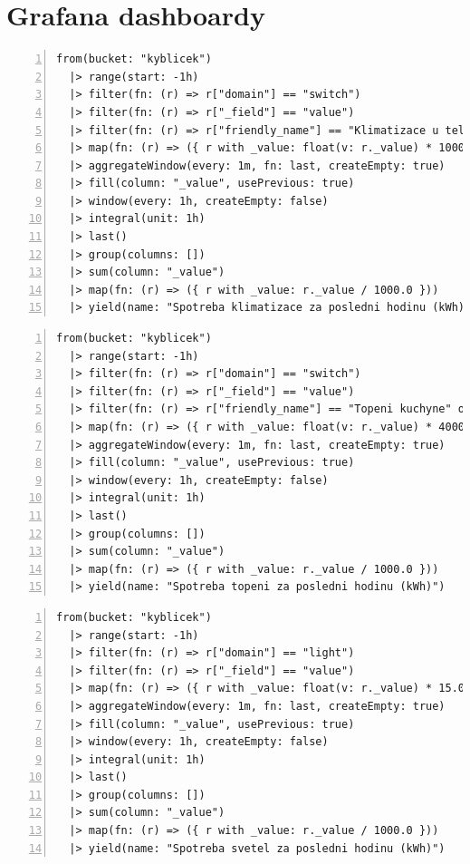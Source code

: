 \chapter{Grafana dashboardy}
\label{apend:grafana}
\begin{lstlisting}[language=flux, breaklines=true, numbers=left, numberstyle=\small, numbersep=10pt, frame=single, basicstyle=\ttfamily\small, caption={Grafana - Spotřeba klimatizace}, label={lst:grafanaKlimatizaceEnergie}]
from(bucket: "kyblicek")
  |> range(start: -1h)
  |> filter(fn: (r) => r["domain"] == "switch")
  |> filter(fn: (r) => r["_field"] == "value")
  |> filter(fn: (r) => r["friendly_name"] == "Klimatizace u televize" or r["friendly_name"] == "Leva zaluzie" or r["friendly_name"] == "Prava zaluzie")
  |> map(fn: (r) => ({ r with _value: float(v: r._value) * 1000.0 }))
  |> aggregateWindow(every: 1m, fn: last, createEmpty: true)
  |> fill(column: "_value", usePrevious: true)
  |> window(every: 1h, createEmpty: false)
  |> integral(unit: 1h)
  |> last()
  |> group(columns: [])
  |> sum(column: "_value")
  |> map(fn: (r) => ({ r with _value: r._value / 1000.0 }))
  |> yield(name: "Spotreba klimatizace za posledni hodinu (kWh)")
\end{lstlisting} 
\begin{lstlisting}[language=flux, breaklines=true, numbers=left, numberstyle=\small, numbersep=10pt, frame=single, basicstyle=\ttfamily\small, caption={Grafana - Spotřeba topení}, label={lst:grafanaTopeniEnergie}]
from(bucket: "kyblicek")
  |> range(start: -1h)
  |> filter(fn: (r) => r["domain"] == "switch")
  |> filter(fn: (r) => r["_field"] == "value")
  |> filter(fn: (r) => r["friendly_name"] == "Topeni kuchyne" or r["friendly_name"] == "Topeni pracovna" or r["friendly_name"] == "Topeni u televize")
  |> map(fn: (r) => ({ r with _value: float(v: r._value) * 4000.0 }))
  |> aggregateWindow(every: 1m, fn: last, createEmpty: true)
  |> fill(column: "_value", usePrevious: true)
  |> window(every: 1h, createEmpty: false)
  |> integral(unit: 1h)
  |> last()
  |> group(columns: [])
  |> sum(column: "_value")
  |> map(fn: (r) => ({ r with _value: r._value / 1000.0 }))
  |> yield(name: "Spotreba topeni za posledni hodinu (kWh)")
\end{lstlisting}
\pagebreak
\begin{lstlisting}[language=flux, breaklines=true, numbers=left, numberstyle=\small, numbersep=10pt, frame=single, basicstyle=\ttfamily\small, caption={Grafana - Spotřeba světla}, label={lst:grafanaSvetloEnergie}]
from(bucket: "kyblicek")
  |> range(start: -1h)
  |> filter(fn: (r) => r["domain"] == "light")
  |> filter(fn: (r) => r["_field"] == "value")
  |> map(fn: (r) => ({ r with _value: float(v: r._value) * 15.0 }))
  |> aggregateWindow(every: 1m, fn: last, createEmpty: true)
  |> fill(column: "_value", usePrevious: true)
  |> window(every: 1h, createEmpty: false)
  |> integral(unit: 1h)
  |> last()
  |> group(columns: [])
  |> sum(column: "_value")
  |> map(fn: (r) => ({ r with _value: r._value / 1000.0 }))
  |> yield(name: "Spotreba svetel za posledni hodinu (kWh)")
\end{lstlisting}
